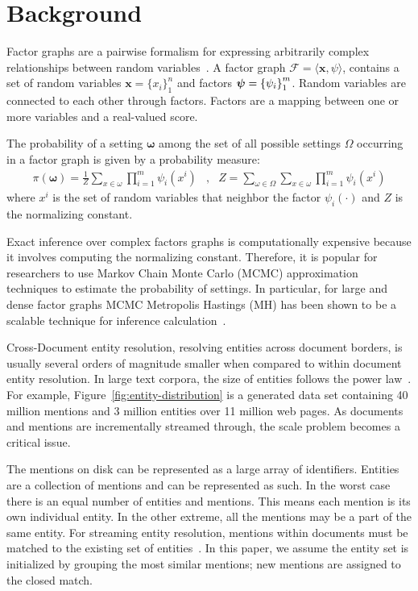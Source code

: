 
\section{Background}
\label{sec:optimizer:background}

Factor graphs
are a pairwise formalism for expressing arbitrarily complex
relationships between random variables~\cite{koller2009probabilistic}.
A factor graph $\mathcal{F} = \langle \textbf{x}, \psi \rangle$, contains a set of random
variables $ \textbf{x} = {\{x_i \}}^n_1$ and
factors ${\textbf{\boldmath$\psi$\unboldmath}} = { \{\psi_i\} }^m_1 $.
Random variables are connected to each other through factors.
Factors are a mapping between one or more variables and a real-valued score.

The probability of a setting $\mathbf{\omega}$ among the set of all possible
settings $\Omega$ occurring in a factor graph is given by a probability measure:
\begin{align*}
\pi(\mathbf{\omega}) = \frac{1}{Z} \sum_{x \in \omega} \prod_{i=1}^{m} \psi_i(x^i) &,&  Z = \sum_{\omega \in \Omega} \sum_{x \in \omega}  \prod_{i=1}^{m} \psi_i(x^i) 
\end{align*}
where $x^i$ is the set of random variables that neighbor the factor
$\psi_{i}(\cdot)$ and $Z$ is the normalizing constant.


Exact inference over complex factors graphs is computationally expensive
because it involves computing the normalizing constant.
Therefore, it is popular for researchers to use Markov Chain Monte Carlo (MCMC) 
approximation techniques to estimate the probability of settings.
In particular, for large and dense factor graphs MCMC Metropolis Hastings (MH) has
been shown to be a scalable technique for inference calculation~\cite{singh2011large}.

Cross-Document entity resolution, resolving entities across document borders,
is usually several orders of magnitude smaller when compared to within document entity resolution.
In large text corpora, the size of entities follows the power law~\cite{singh12:wiki-links}.
For example, Figure~\ref{fig:entity-distribution} is a generated data set containing
40 million mentions and 3 million entities over 11 million web pages.
As documents and mentions are incrementally streamed through,
the scale problem becomes a critical issue.

The mentions on disk can be represented as a large array of identifiers.
Entities are a collection of mentions and can be represented as such.
In the worst case there is an equal number of entities and mentions.
This means each mention is its own individual entity.
In the other extreme, all the mentions may be a part of the same entity.
For streaming entity resolution, mentions within documents
must be matched to the existing set of entities~\cite{rao2010streaming}.
In this paper, we assume the entity set is initialized by grouping the most
similar mentions; new mentions are assigned to the closed match.


